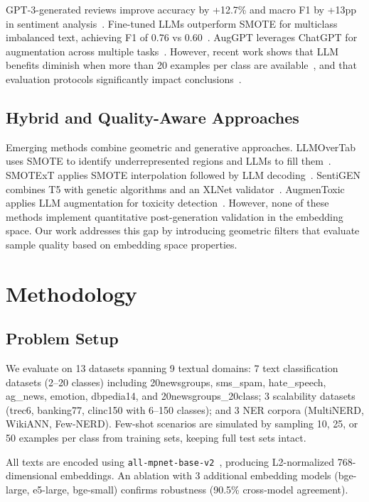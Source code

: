 \documentclass[conference]{IEEEtran}
\begin{document}
GPT-3-generated reviews improve accuracy by +12.7\% and macro F1 by +13pp in sentiment analysis~\cite{suhaeni2023mitigating}. Fine-tuned LLMs outperform SMOTE for multiclass imbalanced text, achieving F1 of 0.76 vs 0.60~\cite{cloutier2023fine}. AugGPT leverages ChatGPT for augmentation across multiple tasks~\cite{dai2023auggpt}. However, recent work shows that LLM benefits diminish when more than 20 examples per class are available~\cite{cegin2025llms}, and that evaluation protocols significantly impact conclusions~\cite{piedboeuf2024evaluation}.

\subsection{Hybrid and Quality-Aware Approaches}

Emerging methods combine geometric and generative approaches. LLMOverTab uses SMOTE to identify underrepresented regions and LLMs to fill them~\cite{isomura2025llmovertab}. SMOTExT applies SMOTE interpolation followed by LLM decoding~\cite{smotext2025arxiv}. SentiGEN combines T5 with genetic algorithms and an XLNet validator~\cite{sundararajan2023sentigen}. AugmenToxic applies LLM augmentation for toxicity detection~\cite{bodaghi2024augmentoxic}. However, none of these methods implement quantitative post-generation validation in the embedding space. Our work addresses this gap by introducing geometric filters that evaluate sample quality based on embedding space properties.

\section{Methodology}

\subsection{Problem Setup}

We evaluate on 13 datasets spanning 9 textual domains: 7 text classification datasets (2--20 classes) including 20newsgroups, sms\_spam, hate\_speech, ag\_news, emotion, dbpedia14, and 20newsgroups\_20class; 3 scalability datasets (trec6, banking77, clinc150 with 6--150 classes); and 3 NER corpora (MultiNERD, WikiANN, Few-NERD). Few-shot scenarios are simulated by sampling 10, 25, or 50 examples per class from training sets, keeping full test sets intact.

All texts are encoded using \texttt{all-mpnet-base-v2}~\cite{reimers-gurevych-2019-sentence,muennighoff2023mteb}, producing L2-normalized 768-dimensional embeddings. An ablation with 3 additional embedding models (bge-large, e5-large, bge-small) confirms robustness (90.5\% cross-model agreement).
\end{document}

